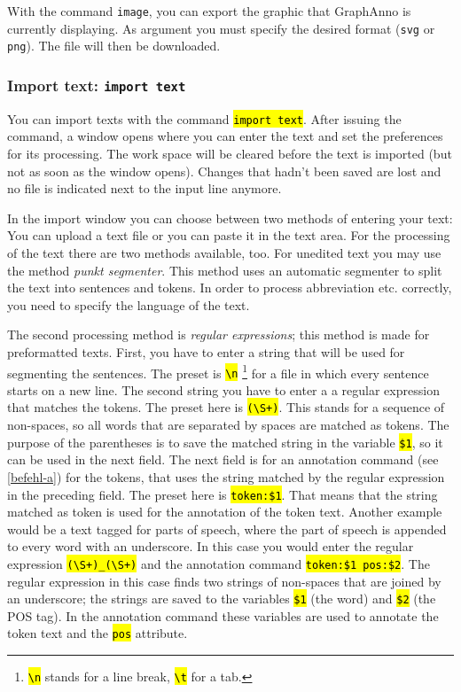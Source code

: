 \documentclass[12pt]{scrartcl}
\newcommand{\code}[1]{\hl{\texttt{#1}}}
\begin{document}
With the command \texttt{image}, you can export the graphic that GraphAnno is currently displaying.
As argument you must specify the desired format (\texttt{svg} or \texttt{png}).
The file will then be downloaded.


\subsubsection{Import text: \texttt{import text}}\label{befehl-import}

You can import texts with the command \code{import text}. After issuing the command, a window opens where you can enter the text and set the preferences for its processing.
The work space will be cleared before the text is imported (but not as soon as the window opens).
Changes that hadn’t been saved are lost and no file is indicated next to the input line anymore.

In the import window you can choose between two methods of entering your text:
You can upload a text file or you can paste it in the text area.
For the processing of the text there are two methods available, too.
For unedited text you may use the method \textit{punkt segmenter}.
This method uses an automatic segmenter to split the text into sentences and tokens.
In order to process abbreviation etc. correctly, you need to specify the language of the text.

The second processing method is \textit{regular expressions}; this method is made for preformatted texts.
First, you have to enter a string that will be used for segmenting the sentences.
The preset is \code{{\textbackslash}n} \footnote{\code{{\textbackslash}n} stands for a line break, \code{{\textbackslash}t} for a tab.} for a file in which every sentence starts on a new line.
The second string you have to enter a a regular expression that matches the tokens.
The preset here is \code{({\textbackslash}S+)}.
This stands for a sequence of non-spaces, so all words that are separated by spaces are matched as tokens.
The purpose of the parentheses is to save the matched string in the variable \code{\$1}, so it can be used in the next field.
The next field is for an annotation command (see \ref{befehl-a}) for the tokens, that uses the string matched by the regular expression in the preceding field.
The preset here is \code{token:\$1}.
That means that the string matched as token is used for the annotation of the token text.
Another example would be a text tagged for parts of speech, where the part of speech is appended to every word with an underscore.
In this case you would enter the regular expression \code{({\textbackslash}S+)\_({\textbackslash}S+)} and the annotation command \code{token:\$1 pos:\$2}.
The regular expression in this case finds two strings of non-spaces that are joined by an underscore; the strings are saved to the variables \code{\$1} (the word) and \code{\$2} (the POS tag).
In the annotation command these variables are used to annotate the token text and the \code{pos} attribute.
\end{document}
